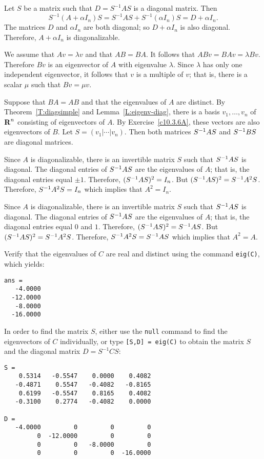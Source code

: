 Let $S$ be a matrix such that $D = S^{-1}AS$ is a diagonal matrix.
Then
\[
S^{-1}(A + \alpha I_n)S = S^{-1}AS + S^{-1}(\alpha I_n)S =
D + \alpha I_n.
\]
The matrices $D$ and $\alpha I_n$ are both diagonal; so $D + \alpha I_n$
is also diagonal.  Therefore, $A + \alpha I_n$ is diagonalizable.


  We assume that $Av=\lambda v$ and that $AB=BA$.  It follows that 
$ABv=BAv=\lambda Bv$.  Therefore $Bv$ is an eigenvector of $A$ with eigenvalue
$\lambda$.  Since $\lambda$ has only one independent eigenvector, it follows that 
$v$ is a multiple of $v$; that is, there is a scalar $\mu$ such that $Bv=\mu v$.

  Suppose that $BA=AB$ and that the eigenvalues of $A$ are distinct. 
By Theorem~\ref{T:diagsimple} and Lemma~\ref{L:eigenv-diag}, 
there is a basis $v_1,\ldots,v_n$ of $\mbox{$\bf{R}$}^n$ consisting of eigenvectors of $A$.  By 
Exercise~\ref{c10.3.6A}, these vectors are also eigenvectors of $B$.  Let 
$S=(v_1|\cdots|v_n)$.  Then both matrices $S^{-1} AS$ and $S^{-1} BS$ are diagonal 
matrices.

 Since $A$ is diagonalizable, there is an invertible matrix $S$ such 
that $S^{-1} AS$ is diagonal.  The diagonal entries of  $S^{-1} AS$ are the eigenvalues
of $A$; that is, the diagonal entries equal $\pm 1$.  Therefore, $(S^{-1} AS)^2=I_n$.
But $(S^{-1} AS)^2 = S^{-1} A^2 S$.   Therefore, $S^{-1} A^2 S=I_n$ which implies that
$A^2=I_n$.

  Since $A$ is diagonalizable, there is an invertible matrix $S$ such 
that $S^{-1} AS$ is diagonal.  The diagonal entries of  $S^{-1} AS$ are the eigenvalues
of $A$; that is, the diagonal entries equal $0$ and $1$.  Therefore, 
$(S^{-1} AS)^2=S^{-1} AS$.  But $(S^{-1} AS)^2 = S^{-1} A^2 S$.   Therefore, 
$S^{-1} A^2 S= S^{-1} AS$ which implies that $A^2=A$.

Verify that the eigenvalues of $C$ are real and distinct using the
\Matlab command {\tt eig(C)}, which yields:
\begin{verbatim}
ans =
   -4.0000
  -12.0000
   -8.0000
  -16.0000
\end{verbatim}
In order to find the matrix $S$, either use the {\tt null} command to
find the eigenvectors of $C$ individually, or type
{\tt [S,D] = eig(C)} to obtain the matrix $S$ and the diagonal matrix
$D = S^{-1}CS$:
\begin{verbatim}
S =
    0.5314   -0.5547    0.0000    0.4082
   -0.4871    0.5547   -0.4082   -0.8165
    0.6199   -0.5547    0.8165    0.4082
   -0.3100    0.2774   -0.4082    0.0000

D =
   -4.0000         0         0         0
         0  -12.0000         0         0
         0         0   -8.0000         0
         0         0         0  -16.0000
\end{verbatim}

